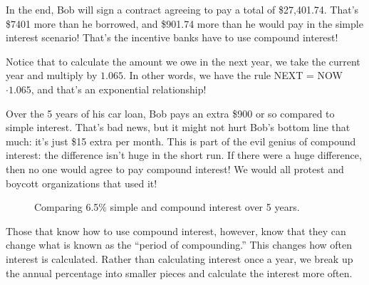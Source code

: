 In the end, Bob will sign a contract agreeing to pay a total of \$27,401.74. That's \$7401 more than he borrowed, and \$901.74 more than he would pay in the simple interest scenario! That's the incentive banks have to use compound interest!

Notice that to calculate the amount we owe in the next year, we take the current year and multiply by $1.065$. In other words, we have the rule NEXT = NOW $\cdot 1.065$, and that's an exponential relationship!


Over the 5 years of his car loan, Bob pays an extra \$900 or so compared to simple interest. That's bad news, but it might not hurt Bob's bottom line that much: it's just \$15 extra per month. This is part of the evil genius of compound interest: the difference isn't huge in the short run. If there were a huge difference, then no one would agree to pay compound interest! We would all protest and boycott organizations that used it!

\begin{figure}[!htbp]
\centering
{}
\caption{Comparing 6.5\% simple and compound interest over 5 years.}
\label{fig:simplecompoundcomparison}
\end{figure}

Those that know how to use compound interest, however, know that they can change what is known as the ``period of compounding.'' This changes how often interest is calculated. Rather than calculating interest once a year, we break up the annual percentage into smaller pieces and calculate the interest more often.

